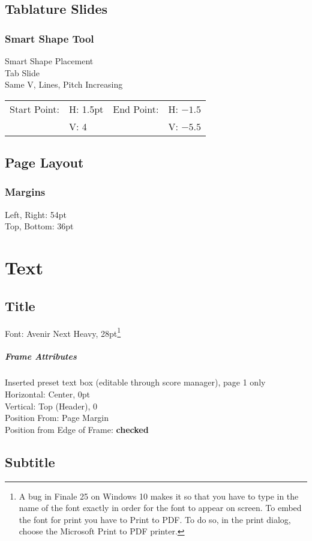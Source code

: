\documentclass[]{memoir}
\begin{document}
\section{Tablature Slides}
\subsection{Smart Shape Tool}
Smart Shape Placement\\
Tab Slide\\
Same V, Lines, Pitch Increasing\\
\begin{tabular}{l l l l}
Start Point: & H: 1.5pt & End Point: & H: $-1.5$\\
& V: 4 & & V: $-5.5$\\
\end{tabular}
\section{Page Layout}
\subsection{Margins}
Left, Right: 54pt\\
Top, Bottom: 36pt
\chapter{Text}
\section{Title}
Font: Avenir Next Heavy, 28pt\footnote{A bug in Finale 25 on Windows
  10 makes it so that you have to type in the name of the font exactly
  in order for the font to appear on screen. To embed the font for
  print you have to Print to PDF. To do so, in the print dialog,
  choose the Microsoft Print to PDF printer.}

\paragraph{Frame Attributes}
Inserted preset text box (editable through score manager), page 1 only\\
Horizontal: Center, 0pt\\
Vertical: Top (Header), 0\\
Position From: Page Margin\\
Position from Edge of Frame: \textbf{checked}

\section{Subtitle}
\label{sec:subtitle}
\end{document}
